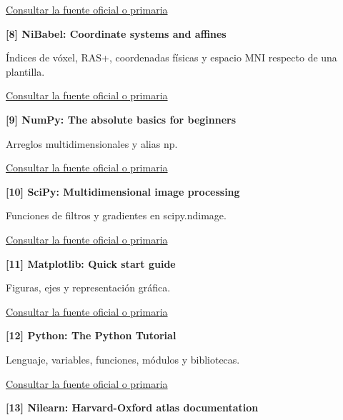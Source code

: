 \href{https://nipy.org/nibabel/nibabel_images.html}{Consultar la fuente oficial o primaria}\par\medskip

\hypertarget{refR8}{}\textbf{[8] NiBabel: Coordinate systems and affines}\par

Índices de vóxel, RAS+, coordenadas físicas y espacio MNI respecto de una plantilla.


\href{https://nipy.org/nibabel/coordinate_systems.html}{Consultar la fuente oficial o primaria}\par\medskip

\hypertarget{refR9}{}\textbf{[9] NumPy: The absolute basics for beginners}\par

Arreglos multidimensionales y alias np.


\href{https://numpy.org/doc/stable/user/absolute_beginners.html}{Consultar la fuente oficial o primaria}\par\medskip

\hypertarget{refR10}{}\textbf{[10] SciPy: Multidimensional image processing}\par

Funciones de filtros y gradientes en scipy.ndimage.


\href{https://docs.scipy.org/doc/scipy/reference/ndimage.html}{Consultar la fuente oficial o primaria}\par\medskip

\hypertarget{refR11}{}\textbf{[11] Matplotlib: Quick start guide}\par

Figuras, ejes y representación gráfica.


\href{https://matplotlib.org/stable/users/explain/quick_start.html}{Consultar la fuente oficial o primaria}\par\medskip

\hypertarget{refR12}{}\textbf{[12] Python: The Python Tutorial}\par

Lenguaje, variables, funciones, módulos y bibliotecas.


\href{https://docs.python.org/3/tutorial/}{Consultar la fuente oficial o primaria}\par\medskip

\hypertarget{refR13}{}\textbf{[13] Nilearn: Harvard-Oxford atlas documentation}\par

